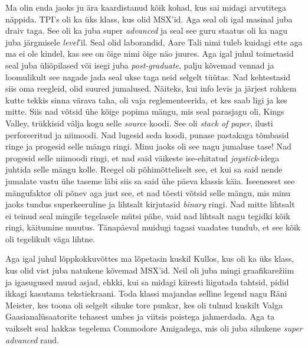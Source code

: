 Ma olin enda jaoks ju ära kaardistanud kõik kohad, kus sai midagi arvutitega näppida. TPI's oli ka üks klass, kus olid MSX'id. Aga seal oli igal masinal juba draiv taga. See oli ka juba super \emph{advanced} ja seal see guru staatus oli ka nagu juba järgmisele \emph{level}'il. Seal olid  laborandid, Aare Tali nimi tuleb kuidagi ette aga ma ei ole kindel, kas see on õige nimi õige näo juures. Aga igal juhul toimetasid seal juba üliõpilased või isegi juba \emph{post-graduate},  palju kõvemad vennad ja loomulikult see nagade jada seal ukse taga neid selgelt tüütas. Nad kehtestasid siis oma  reegleid, olid suured jumalused. Näiteks, kui info levis ja järjest rohkem kutte tekkis sinna värava taha,  oli vaja reglementeerida, et kes saab ligi ja kes mitte. Siis nad võtsid ühe kõige popima mängu, mis seal parasjagu oli, Kings Valley, trükkisid välja kogu selle \emph{source} koodi. See oli \emph{stack of paper}, ilusti perforeeritud ja niimoodi. Nad lugesid seda koodi, punase pastakaga tõmbasid ringe ja progesid selle mängu ringi. Minu jaoks oli see nagu jumaluse tase! Nad progesid selle niimoodi ringi, et nad said väikeste ise-ehitatud \emph{joystick}-idega juhtida selle mängu kolle. Reegel oli põhimõtteliselt see, et kui sa said nende jumalate vastu ühe taseme läbi siis sa said ühe päeva klassis käia. Iseenesest see mängufaktor  oli põnev aga just see, et nad tõesti võtsid selle mängu, mis minu jaoks tundus superkeeruline ja lihtsalt kirjutasid \emph{binary} ringi. Nad mitte lihtsalt ei teinud seal mingile tegelasele mütsi pähe,  vaid nad lihtsalt nagu tegidki kõik ringi, käitumine muutus. Tänapäeval muidugi tagasi vaadates tundub, et see kõik oli tegelikult väga lihtne.


Aga igal juhul lõppkokkuvõttes ma lõpetasin kuskil Kullos, kus oli ka üks klass, kus olid vist juba natukene kõvemad MSX'id. Neil oli juba  mingi graafikarežiim ja igasugused muud asjad, ehkki, kui sa midagi kiiresti liigutada tahtsid, pidid ikkagi kasutama tekstiekraani. Toda klassi majandas selline legend nagu Räni Meister, kes toona oli selgelt sihuke tore punkar, kes oli tulnud kuskilt Valga Gaasianalüsaatorite tehasest umbes ja viitsis poistega jahmerdada. Aga ta vaikselt seal hakkas tegelema Commodore Amigadega, mis oli juba sihukene \emph{super advanced} raud. 

